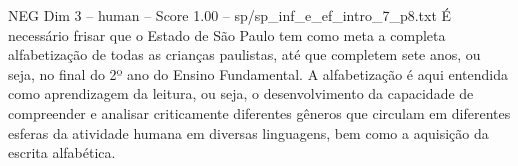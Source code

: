 \begin{textsample}{NEG Dim 3 – human – Score 1.00 – sp/sp\_inf\_e\_ef\_intro\_7\_p8.txt}  \label{ex:f3_neg_008}
É necessário frisar que o Estado de São Paulo tem como meta a completa alfabetização de todas as crianças paulistas, até que completem sete anos, ou seja, no final do 2º ano do Ensino Fundamental.
A alfabetização é aqui entendida como aprendizagem da leitura, ou seja, o desenvolvimento da capacidade de compreender e analisar criticamente diferentes gêneros que circulam em diferentes esferas da atividade humana em diversas linguagens, bem como a aquisição da escrita alfabética.

\end{textsample}

